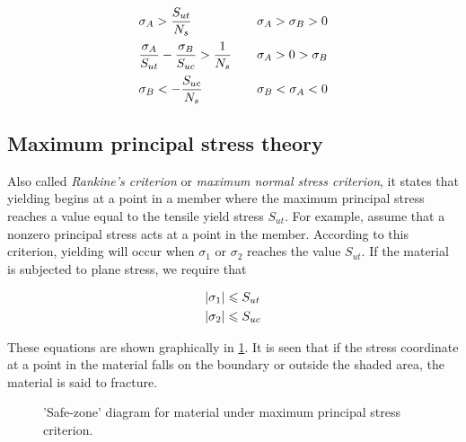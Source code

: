 \documentclass[
10pt,
a4paper,
openany,
svgnames,
]{book} %
\begin{document}
\begin{equation}
  \begin{array}{l l l}
  \sigma_A > \dfrac{S_{ut}}{N_s} & & \sigma_A > \sigma_B > 0 \\[10pt]
  \dfrac{\sigma_A}{S_{ut}} - \dfrac{\sigma_B}{S_{uc}} > \dfrac{1}{N_s} & & \sigma_A > 0 > \sigma_B \\[10pt]
    \sigma_B <  -\dfrac{S_{uc}}{N_s} & & \sigma_B < \sigma_A < 0
  \end{array}
\end{equation}

\subsection{Maximum principal stress theory}

Also called \emph{Rankine’s criterion} or \emph{maximum normal stress criterion}, it states that yielding begins at a point in a member where the maximum principal stress reaches a value equal to the tensile yield stress $S_{ut}$. For example, assume that a nonzero principal stress acts at a point in the member. According to this criterion, yielding will occur when $\sigma_1$ or $\sigma_2$ reaches the value $S_{ut}$. If the material is subjected to plane stress, we require that

\[\begin{gathered}
    \left| \sigma _1 \right| \leqslant S_{ut} \hfill \\
    \left| \sigma _2 \right| \leqslant S_{uc} \hfill \\ 
  \end{gathered} \]

These equations are shown graphically in \cref{fig: MNST safe zone}. It is seen that if the stress coordinate at a point in the material falls on the boundary or outside the shaded area, the material is said to fracture.

\begin{figure}[h]
  \centering
  \caption{'Safe-zone' diagram for material under maximum principal stress criterion.}
  \label{fig: MNST safe zone}
\end{figure}
\end{document}
